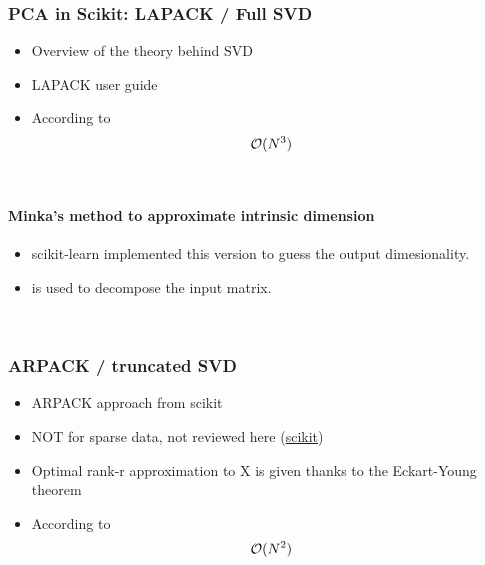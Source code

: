 \clearpage



\subsubsection{PCA in Scikit: LAPACK / Full SVD}

\begin{itemize}
	\item Overview of the theory behind SVD
	\item LAPACK user guide \cite{anderson1999lapack}
	\item According to \cite{wright2001large}
	$$\mathcal{O}(N^3)$$
\end{itemize}

\ \clearpage
\ \clearpage


\paragraph{Minka's method to approximate intrinsic dimension}

\begin{itemize}
	\item scikit-learn implemented this version \cite{minka2000automatic} to guess the output dimesionality. 
	\item \cite{halko2011finding, brunton2019data} is used to decompose the input matrix.
\end{itemize}

\ \clearpage


\subsubsection{ARPACK / truncated SVD}

\begin{itemize}
	\item \cite{wright2001large} ARPACK approach from scikit
	\item NOT for sparse data, not reviewed here (\href{https://scikit-learn.org/stable/modules/generated/sklearn.decomposition.PCA.html}{scikit})
	\item Optimal rank-r approximation to X is given thanks to the Eckart-Young theorem \cite{eckart1936approximation}
	\item According to \cite{wright2001large, brunton2019data}
	$$\mathcal{O}(N^2)$$

\end{itemize}

